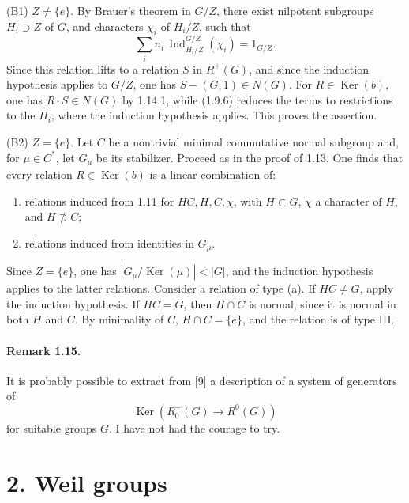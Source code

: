 \documentclass[10pt]{article}
\newcommand{\Ind}{\operatorname{Ind}}
\providecommand{\Ker}{\operatorname{Ker}}
\providecommand{\Ind}{\operatorname{Ind}}
\providecommand{\Ker}{\operatorname{Ker}}
\begin{document}
(B1) \(Z\ne\{e\}\). By Brauer's theorem in \(G/Z\), there exist nilpotent subgroups \(H_i\supset Z\) of \(G\), and characters \(\chi_i\) of \(H_i/Z\), such that
\[
\sum_i n_i\,\Ind_{H_i/Z}^{G/Z}(\chi_i)=1_{G/Z}.
\]
Since this relation lifts to a relation \(S\) in \(R^+(G)\), and since the induction hypothesis applies to \(G/Z\), one has \(S-(G,1)\in N(G)\). For \(R\in\Ker(b)\), one has \(R\cdot S\in N(G)\) by 1.14.1, while (1.9.6) reduces the terms to restrictions to the \(H_i\), where the induction hypothesis applies. This proves the assertion.

(B2) \(Z=\{e\}\). Let \(C\) be a nontrivial minimal commutative normal subgroup and, for \(\mu\in C^*\), let \(G_\mu\) be its stabilizer. Proceed as in the proof of 1.13. One finds that every relation \(R\in\Ker(b)\) is a linear combination of:
\begin{enumerate}[label=(\alph*)]
\item relations induced from 1.11 for \(HC,H,C,\chi\), with \(H\subset G\), \(\chi\) a character of \(H\), and \(H\not\supset C\);
\item relations induced from identities in \(G_\mu\).
\end{enumerate}
Since \(Z=\{e\}\), one has \(|G_\mu/\Ker(\mu)|<|G|\), and the induction hypothesis applies to the latter relations. Consider a relation of type (a). If \(HC\ne G\), apply the induction hypothesis. If \(HC=G\), then \(H\cap C\) is normal, since it is normal in both \(H\) and \(C\). By minimality of \(C\), \(H\cap C=\{e\}\), and the relation is of type III.

\paragraph{Remark 1.15.} It is probably possible to extract from [9] a description of a system of generators of
\[
\Ker(R^+_0(G)\longrightarrow R^0(G))
\]
for suitable groups \(G\). I have not had the courage to try.

\section*{2. Weil groups}
\end{document}
